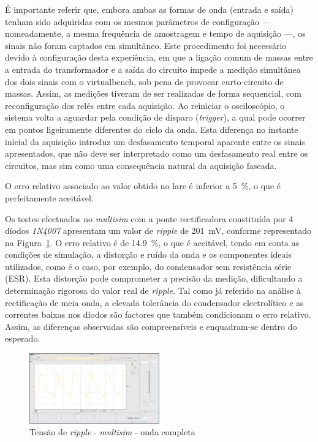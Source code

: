 É importante referir que, embora ambas as formas de onda (entrada e saída) tenham sido adquiridas com os mesmos parâmetros de configuração — nomeadamente, a mesma frequência de amostragem e tempo de aquisição —, os sinais não foram captados em simultâneo. Este procedimento foi necessário devido à configuração desta experiência, em que a ligação comum de massas entre a entrada do transformador e a saída do circuito impede a medição simultânea dos dois sinais com o \acrshort{virtualbench}, sob pena de provocar curto-circuito de massas. Assim, as medições tiveram de ser realizadas de forma sequencial, com reconfiguração dos relés entre cada aquisição. Ao reiniciar o osciloscópio, o sistema volta a aguardar pela condição de disparo (\textit{trigger}), a qual pode ocorrer em pontos ligeiramente diferentes do ciclo da onda. Esta diferença no instante inicial da aquisição introduz um desfasamento temporal aparente entre os sinais apresentados, que não deve ser interpretado como um desfasamento real entre os circuitos, mas sim como uma consequência natural da aquisição faseada.

O erro relativo associado ao valor obtido no \acrshort{lare} é inferior a \SI{5}{\percent}, o que é perfeitamente aceitável.

Os testes efectuados no \textit{multisim} com a ponte rectificadora constituída por 4 díodos \textit{1N4007} apresentam um valor de \textit{ripple} de \SI{201}{\milli\volt}, conforme representado na Figura~\ref{fig:ripplemultisim}. O erro relativo é de \SI{14.9}{\percent}, o que é aceitável, tendo em conta as condições de simulação, a distorção e ruído da onda e os componentes ideais utilizados, como é o caso, por exemplo, do condensador sem resistência série (ESR). Esta distorção pode comprometer a precisão da medição, dificultando a determinação rigorosa do valor real de \textit{ripple}. Tal como já referido na análise à rectificação de meia onda, a elevada tolerância do condensador electrolítico e as correntes baixas nos díodos são factores que também condicionam o erro relativo. Assim, as diferenças observadas são compreensíveis e enquadram-se dentro do esperado.

\begin{figure}[hbtp]
	\centering
	\includegraphics[width=0.5\textwidth]{figures/OC_RIPPLE_VB_1N4007.png}
	\caption{Tensão de \textit{ripple} - \textit{multisim} - onda completa}
	\label{fig:ripplemultisim}
\end{figure}

